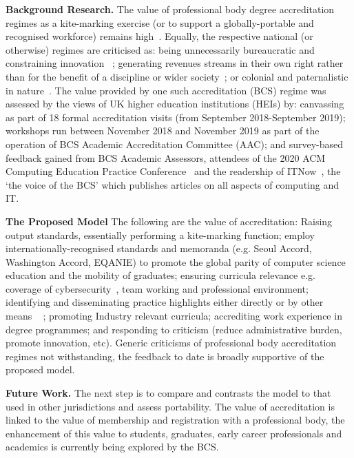 \documentclass[sigconf]{acmart}
\begin{document}
\textbf{ Background Research.} The value of professional body degree accreditation regimes as a
kite-marking exercise (or to support a globally-portable and
recognised workforce) remains high~\cite{Knight_2015}. Equally, the
respective national (or otherwise) regimes are criticised as: being unnecessarily bureaucratic and  
constraining innovation ~\cite{Harvey2004};
generating revenues streams in their own right rather than for the
benefit of a discipline or wider society~\cite{Knight_2015}; or
colonial and paternalistic in nature~\cite{Mutereko2017}. The value provided by one such accreditation (BCS) regime was assessed by the views of UK higher education institutions (HEIs) by: canvassing as part of 18 formal accreditation visits (from
September 2018-September 2019); workshops run between November 2018
and November 2019 as part of the operation of BCS Academic
Accreditation Committee (AAC); and survey-based feedback gained from
BCS Academic Assessors, attendees of the 2020 ACM Computing Education
Practice Conference~\cite{CrickEtAl2020Cep} and the
readership of ITNow~\cite{CrickEtAl2020ITNow}, the `the voice of the
BCS' which publishes articles on all aspects of computing and IT.  

\textbf{The Proposed Model}   The following are the value of accreditation: Raising output standards, essentially performing a
		kite-marking function; employ internationally-recognised standards and
		memoranda (e.g. Seoul Accord, Washington Accord, EQANIE) to
		promote the global parity of computer science education and the
		mobility of graduates;	ensuring curricula relevance e.g. coverage of
		cybersecurity~\cite{Cricketal2019}, team working and professional
		environment;
	identifying and disseminating practice highlights
		either directly \cite{practice_highlights_2020} or by other means ~\cite{CrickEtAl2020Cep}
	; promoting Industry relevant curricula; 
	 accrediting work experience in degree programmes; and responding to criticism (reduce administrative burden, promote innovation, etc).
	 Generic criticisms of professional body accreditation regimes not withstanding, the feedback to date is broadly supportive of the proposed model.



\textbf{Future Work.} The next step is to compare and contrasts the model to that used in other jurisdictions and assess portability. The value of accreditation is linked to the value of membership and registration with a professional body, the enhancement of this value to students, graduates, early career professionals and academics is currently being explored by the BCS.  
\end{document}
